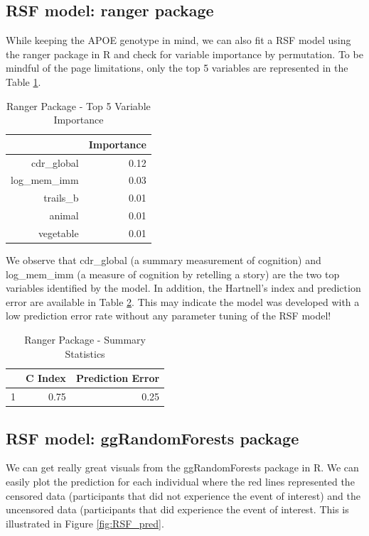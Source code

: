 \documentclass[a4paper,man,natbib,11pt]{article}
\begin{document}
\subsection{RSF model: ranger package}

While keeping the APOE genotype in mind, we can also fit a RSF model using the ranger package in R and check for variable importance by permutation. To be mindful of the page limitations, only the top 5 variables are represented in the Table \ref{ranger_vi}. 

\begin{table}[ht]
\centering
\caption{Ranger Package - Top 5 Variable Importance}
\begin{tabular}{rr}
  \hline
 & Importance \\ 
  \hline
cdr\_global & 0.12 \\ 
  log\_mem\_imm & 0.03 \\ 
  trails\_b & 0.01 \\ 
  animal & 0.01 \\ 
  vegetable & 0.01 \\ 
   \hline
\end{tabular}
\label{ranger_vi}
\end{table}

We observe that cdr\_global (a summary measurement of cognition) and log\_mem\_imm (a measure of cognition by retelling a story) are the two top variables identified by the model. In addition, the Hartnell's index and prediction error are available in Table \ref{ranger_stat}. This may indicate the model was developed with a low prediction error rate without any parameter tuning of the RSF model!

\begin{table}[ht]
\centering
\caption{Ranger Package - Summary Statistics}
\begin{tabular}{rrr}
  \hline
 & C Index & Prediction Error \\ 
  \hline
1 & 0.75 & 0.25 \\ 
   \hline
\end{tabular}
\label{ranger_stat}
\end{table}

\subsection{RSF model: ggRandomForests package}

We can get really great visuals from the ggRandomForests package in R. We can easily plot the prediction for each individual where the red lines represented the censored data (participants that did not experience the event of interest) and the uncensored data (participants that did experience the event of interest. This is illustrated in Figure \ref{fig:RSF_pred}. 
\end{document}
